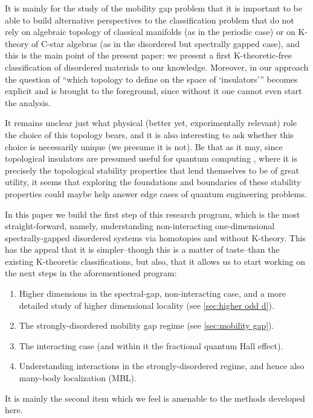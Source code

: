 \documentclass[a4paper,10pt]{article}
\numberwithin{equation}{section}
\theoremstyle{plain}
\theoremstyle{plain}
\theoremstyle{plain}
\theoremstyle{plain}
\theoremstyle{plain}
\theoremstyle{remark}
\theoremstyle{definition}
\theoremstyle{plain}
\begin{document}
	It is mainly for the study of the mobility gap problem that it is important to be able to build alternative perspectives to the classification problem that do not rely on algebraic topology of classical manifolds (as in the periodic case) or on K-theory of C-star algebras (as in the disordered but spectrally gapped case), and this is the main point of the present paper: we present a first K-theoretic-free classification of disordered materials to our knowledge. Moreover, in our approach the question of ``which topology to define on the space of `insulators'\thinspace'' becomes explicit and is brought to the foreground, since without it one cannot even start the analysis.
	
	It remains unclear just what physical (better yet, experimentally relevant) role the choice of this topology bears, and it is also interesting to ask whether this choice is necessarily unique (we presume it is not). Be that as it may, since topological insulators are presumed useful for quantum computing \cite{KempeKitaevRegev2006}, where it is precisely the topological stability properties that lend themselves to be of great utility, it seems that exploring the foundations and boundaries of these stability properties could maybe help answer edge cases of quantum engineering problems.
	
	In this paper we build the first step of this research program, which is the most straight-forward, namely, understanding non-interacting one-dimensional spectrally-gapped disordered systems via homotopies and without K-theory. This has the appeal that it is simpler--though this is a matter of taste--than the existing K-theoretic classifications, but also, that it allows us to start working on the next steps in the aforementioned program:
	\begin{enumerate}
		\item Higher dimensions in the spectral-gap, non-interacting case, and a more detailed study of higher dimensional locality (see \cref{sec:higher odd d}).
		\item The strongly-disordered mobility gap regime (see \cref{sec:mobility gap}).
		\item The interacting case (and within it the fractional quantum Hall effect).
		\item Understanding interactions in the strongly-disordered regime, and hence also many-body localization (MBL).
	\end{enumerate}
	It is mainly the second item which we feel is amenable to the methods developed here.
	
\end{document}
